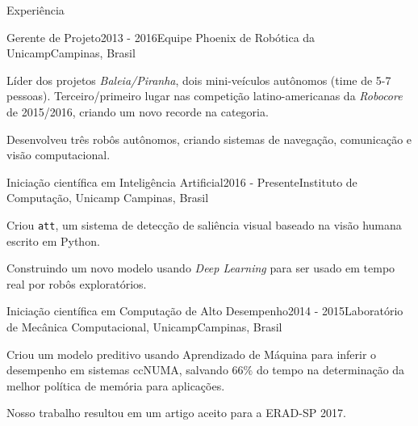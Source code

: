 \documentclass[8pt]{resume}
\newcommand{\tit}[1]{\textit{#1}}
\newcommand{\ttt}[1]{\texttt{#1}}
\begin{document}
\begin{rSection}{Experiência}

\begin{rSubsection}{Gerente de Projeto}{2013 - 2016}{Equipe Phoenix de Robótica da Unicamp}{Campinas, Brasil}
    \item Líder dos projetos \tit{Baleia/Piranha}, dois mini-veículos
        autônomos (time de 5-7 pessoas).
        Terceiro/primeiro lugar nas competição latino-americanas da
        \tit{Robocore} de 2015/2016, criando um novo recorde na categoria.
    \item Desenvolveu três robôs autônomos, criando sistemas de
        navegação, comunicação e visão computacional.
\end{rSubsection}

\begin{rSubsection}{Iniciação científica em Inteligência Artificial}{2016 - Presente}{Instituto de Computação, Unicamp}
    {Campinas, Brasil}
    \item Criou \ttt{att}, um sistema de detecção de saliência visual
        baseado na visão humana escrito em Python.
    \item Construindo um novo modelo usando \tit{Deep Learning} para
        ser usado em tempo real por robôs exploratórios.
\end{rSubsection}

\begin{rSubsection}{Iniciação científica em Computação de Alto Desempenho}{2014 - 2015}{Laboratório de Mecânica Computacional, Unicamp}{Campinas, Brasil}
    \item Criou um modelo preditivo usando Aprendizado de Máquina para inferir
        o desempenho em sistemas ccNUMA,
        salvando $66\%$ do tempo na determinação da melhor política de
        memória para aplicações.
    \item Nosso trabalho resultou em um artigo aceito para a ERAD-SP 2017.
\end{rSubsection}


\end{rSection}
\end{document}
